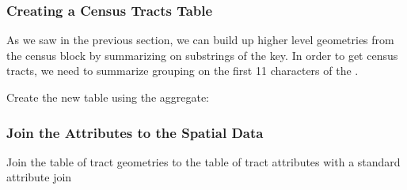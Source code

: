 \documentclass[a4paper,11pt,english]{sphinxmanual}
\begin{document}
\subsubsection{Creating a Census Tracts Table}
\label{\detokenize{advanced:id1}}
As we saw in the previous section, we can build up higher level geometries from the census block by summarizing on substrings of the  key. In order to get census tracts, we need to summarize grouping on the first 11 characters of the .

\begin{sphinxVerbatim}[commandchars=\\\{\}]
      

         
        
   
         
      
\end{sphinxVerbatim}

Create the new table using the  aggregate:

\begin{sphinxVerbatim}[commandchars=\\\{\}]
   
    
    
 
  

  
    
\end{sphinxVerbatim}


\subsubsection{Join the Attributes to the Spatial Data}
\label{\detokenize{advanced:join-the-attributes-to-the-spatial-data}}
Join the table of tract geometries to the table of tract attributes with a standard attribute join
\end{document}
